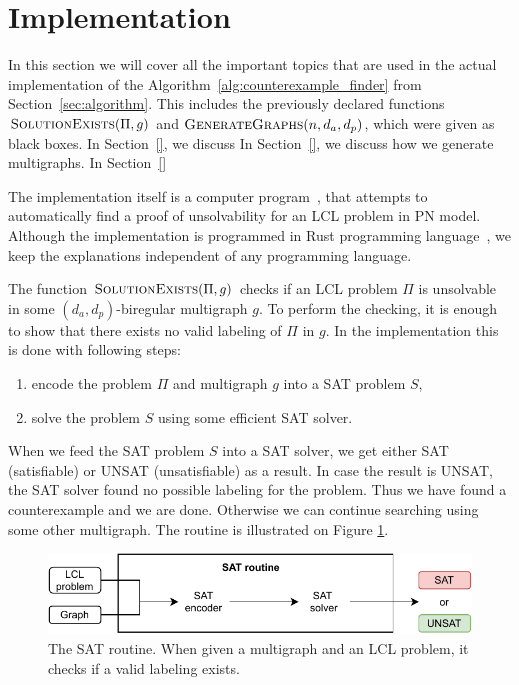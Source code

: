 
\section{Implementation} \label{sec:implementation}
In this section we will cover all the important topics that are used in the actual implementation of the Algorithm~\ref{alg:counterexample_finder} from Section~\ref{sec:algorithm}.
This includes the previously declared functions $\textsc{SolutionExists}(\Pi, g)$ and $\textsc{GenerateGraphs}(n, d_a, d_p)$, which were given as black boxes.
In Section~\ref{}, we discuss 
In Section~\ref{}, we discuss how we generate multigraphs.
In Section~\ref{}

The implementation itself is a computer program~\cite{NonconstantLclClassifier2022}, that attempts to automatically find a proof of unsolvability for an LCL problem in PN model.
Although the implementation is programmed in Rust programming language~\cite{RustLang}, we keep the explanations independent of any programming language.

The function $\textsc{SolutionExists}(\Pi, g)$ checks if an LCL problem $\Pi$ is unsolvable in some $(d_a, d_p)$-biregular multigraph $g$.
To perform the checking, it is enough to show that there exists no valid labeling of $\Pi$ in $g$.
In the implementation this is done with following steps:
\begin{enumerate}
    \item encode the problem $\Pi$ and multigraph $g$ into a SAT problem $S$,
    \item solve the problem $S$ using some efficient SAT solver.
\end{enumerate}
When we feed the SAT problem $S$ into a SAT solver, we get either SAT (satisfiable) or UNSAT (unsatisfiable) as a result.
In case the result is UNSAT, the SAT solver found no possible labeling for the problem.
Thus we have found a counterexample and we are done.
Otherwise we can continue searching using some other multigraph.
The routine is illustrated on Figure \ref{fig:implementation:1}.

\begin{figure}[H]
\centering
\includegraphics[]{diagrams/implementation_idea_diagram2.pdf}
\caption{The SAT routine. When given a multigraph and an LCL problem, it checks if a valid labeling exists.}
\label{fig:implementation:1}
\end{figure}

